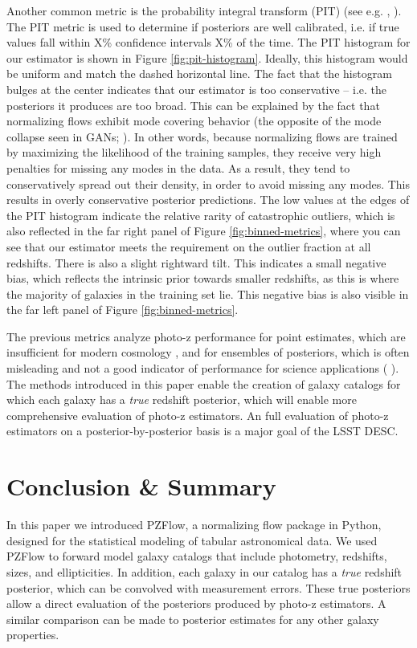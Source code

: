 \documentclass[twocolumn,twocolappendix]{aastex631}
\newcommand{\citePZp}{(\citetalias{schmidt2020} \citeyear{schmidt2020})\xspace}
\newcommand{\citePZa}{\citetalias{schmidt2020} \citeyear{schmidt2020}\xspace}
\begin{document}
Another common metric is the probability integral transform (PIT) (see e.g. \citePZa, \citealt{dey2022}).
The PIT metric is used to determine if posteriors are well calibrated, i.e. if true values fall within X\% confidence intervals X\% of the time.
The PIT histogram for our estimator is shown in Figure \ref{fig:pit-histogram}.
Ideally, this histogram would be uniform and match the dashed horizontal line.
The fact that the histogram bulges at the center indicates that our estimator is too conservative -- i.e. the posteriors it produces are too broad.
This can be explained by the fact that normalizing flows exhibit mode covering behavior (the opposite of the mode collapse seen in GANs; \citealt{salimans2016}).
In other words, because normalizing flows are trained by maximizing the likelihood of the training samples, they receive very high penalties for missing any modes in the data.
As a result, they tend to conservatively spread out their density, in order to avoid missing any modes.
This results in overly conservative posterior predictions.
The low values at the edges of the PIT histogram indicate the relative rarity of catastrophic outliers, which is also reflected in the far right panel of Figure \ref{fig:binned-metrics}, where you can see that our estimator meets the requirement on the outlier fraction at all redshifts.
There is also a slight rightward tilt.
This indicates a small negative bias, which reflects the intrinsic prior towards smaller redshifts, as this is where the majority of galaxies in the training set lie.
This negative bias is also visible in the far left panel of Figure \ref{fig:binned-metrics}.

The previous metrics analyze photo-z performance for point estimates, which are insufficient for modern cosmology \citep{newman2022}, and for ensembles of posteriors, which is often misleading and not a good indicator of performance for science applications \citePZp.
The methods introduced in this paper enable the creation of galaxy catalogs for which each galaxy has a \emph{true} redshift posterior, which will enable more comprehensive evaluation of photo-z estimators.
An full evaluation of photo-z estimators on a posterior-by-posterior basis is a major goal of the LSST DESC.


\section{Conclusion \& Summary}
\label{sec:conclusion}

In this paper we introduced PZFlow, a normalizing flow package in Python, designed for the statistical modeling of tabular astronomical data.
We used PZFlow to forward model galaxy catalogs that include photometry, redshifts, sizes, and ellipticities.
In addition, each galaxy in our catalog has a \emph{true} redshift posterior, which can be convolved with measurement errors.
These true posteriors allow a direct evaluation of the posteriors produced by photo-z estimators.
A similar comparison can be made to posterior estimates for any other galaxy properties.
\end{document}
